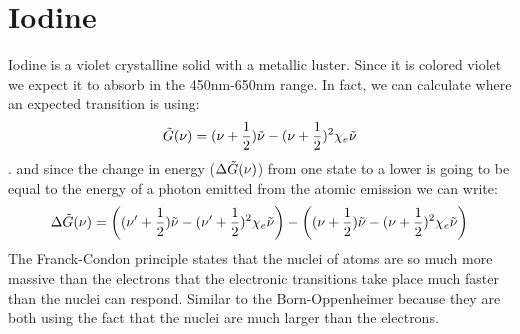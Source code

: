 \documentclass[letterpaper,12pt]{article}
\begin{document}
\section{Iodine}
Iodine is a violet crystalline solid with a metallic luster. Since it is colored violet we expect it to absorb in the 450nm-650nm range. In fact, we can calculate where an expected transition is using:
\begin{equation}
    \Tilde{G}(\nu)=(\nu+\frac{1}{2})\Tilde{\nu}-(\nu+\frac{1}{2})^2\chi_e\Tilde{\nu}
\end{equation}. 
and since the change in energy ($\Delta \Tilde{G}(\nu)$) from one state to a lower is going to be equal to the energy of a photon emitted from the atomic emission we can write:
\begin{equation}
    \Delta \Tilde{G}(\nu)=\left((\nu'+\frac{1}{2})\Tilde{\nu}-(\nu'+\frac{1}{2})^2\chi_e\Tilde{\nu}\right)-\left((\nu+\frac{1}{2})\Tilde{\nu}-(\nu+\frac{1}{2})^2\chi_e\Tilde{\nu}\right)
\end{equation}
The Franck-Condon principle states that the nuclei of atoms are so much more massive than the electrons that the electronic transitions take place much faster than the nuclei can respond. Similar to the Born-Oppenheimer because they are both using the fact that the nuclei are much larger than the electrons. 
\end{document}
